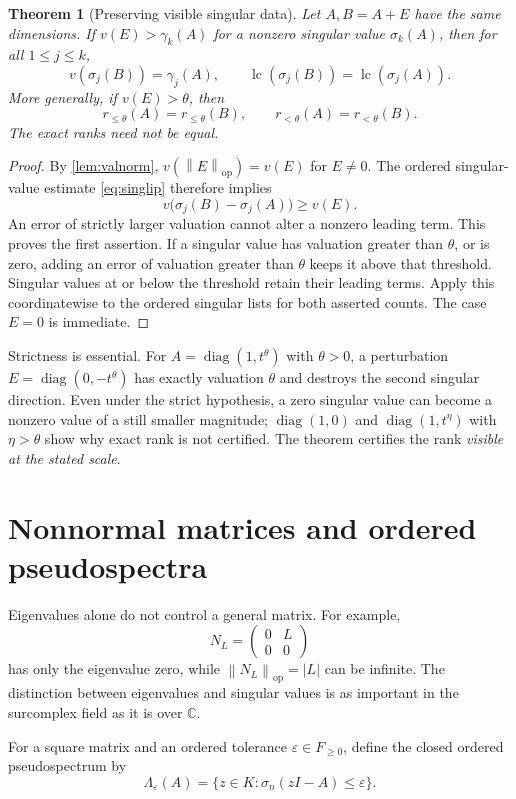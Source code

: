 \documentclass[11pt,a4paper]{article}
\numberwithin{equation}{section}
\newtheorem{theorem}{Theorem}[section]
\theoremstyle{definition}
\theoremstyle{remark}
\newcommand{\C}{\mathbb C}
\newcommand{\lc}{\operatorname{lc}}
\newcommand{\diag}{\operatorname{diag}}
\newcommand{\op}{\mathrm{op}}
\newcommand{\norm}[1]{\left\lVert#1\right\rVert}
\begin{document}
\begin{theorem}[Preserving visible singular data]\label{thm:precision}
Let $A,B=A+E$ have the same dimensions. If
$v(E)>\gamma_k(A)$ for a nonzero singular value $\sigma_k(A)$, then for
all $1\le j\le k$,
\[
 v(\sigma_j(B))=\gamma_j(A),\qquad
 \lc(\sigma_j(B))=\lc(\sigma_j(A)).
\]
More generally, if $v(E)>\theta$, then
\[
 r_{\le\theta}(A)=r_{\le\theta}(B),\qquad
 r_{<\theta}(A)=r_{<\theta}(B).
\]
The exact ranks need not be equal.
\end{theorem}
\begin{proof}
By \cref{lem:valnorm}, $v(\norm E_{\op})=v(E)$ for $E\ne0$. The
ordered singular-value estimate \eqref{eq:singlip} therefore implies
\[
 v\bigl(\sigma_j(B)-\sigma_j(A)\bigr)\ge v(E).
\]
An error of strictly larger valuation cannot alter a nonzero leading term.
This proves the first assertion. If a singular value has valuation greater
than $\theta$, or is zero, adding an error of valuation greater than
$\theta$ keeps it above that threshold. Singular values at or below the
threshold retain their leading terms. Apply this coordinatewise to the
ordered singular lists for both asserted counts. The case $E=0$ is
immediate.
\end{proof}

Strictness is essential. For
$A=\diag(1,t^\theta)$ with $\theta>0$, a perturbation
$E=\diag(0,-t^\theta)$ has exactly valuation $\theta$ and destroys the
second singular direction. Even under the strict hypothesis, a zero
singular value can become a nonzero value of a still smaller magnitude;
$\diag(1,0)$ and $\diag(1,t^\eta)$ with $\eta>\theta$ show why exact
rank is not certified. The theorem certifies the rank \emph{visible at the
stated scale}.

\section{Nonnormal matrices and ordered pseudospectra}\label{sec:pseudo}

Eigenvalues alone do not control a general matrix. For example,
\[
 N_L=\begin{pmatrix}0&L\\0&0\end{pmatrix}
\]
has only the eigenvalue zero, while $\norm{N_L}_{\op}=|L|$ can be infinite.
The distinction between eigenvalues and singular values is as important in
the surcomplex field as it is over $\C$.

For a square matrix and an ordered tolerance $\varepsilon\in F_{\ge0}$,
define the closed ordered pseudospectrum by
\begin{equation}\label{eq:pseudodef}
 \Lambda_\varepsilon(A)=
 \{z\in K:\sigma_n(zI-A)\le\varepsilon\}.
\end{equation}
\end{document}
